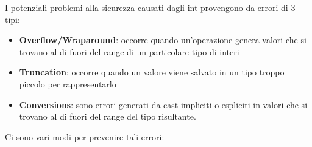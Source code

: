 I potenziali problemi alla sicurezza causati dagli int provengono da errori di 3 tipi:

\begin{itemize}
    \item \textbf{Overflow/Wraparound}: occorre quando un'operazione genera valori
          che si trovano al di fuori del range di un particolare tipo di interi
    \item \textbf{Truncation}: occorre quando un valore viene salvato in un tipo
          troppo piccolo per rappresentarlo
    \item \textbf{Conversions}: sono errori generati da cast impliciti o espliciti
          in valori che si trovano al di fuori del range del tipo risultante.
\end{itemize}

Ci sono vari modi per prevenire tali errori:

